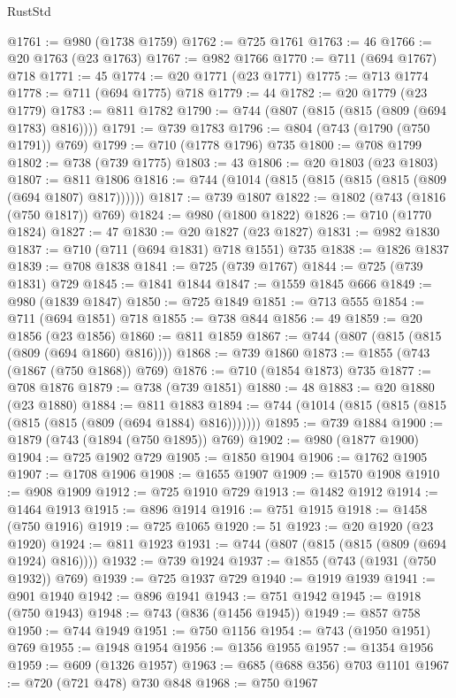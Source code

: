 \begin{lexlean}{RustStd}
\begin{coremodule}
@1761 := @980 (@1738 @1759)
@1762 := @725 @1761
@1763 := 46
@1766 := @20 @1763 (@23 @1763)
@1767 := @982 @1766
@1770 := @711 (@694 @1767) @718
@1771 := 45
@1774 := @20 @1771 (@23 @1771)
@1775 := @713 @1774
@1778 := @711 (@694 @1775) @718
@1779 := 44
@1782 := @20 @1779 (@23 @1779)
@1783 := @811 @1782
@1790 := @744 (@807 (@815 (@815 (@809 (@694 @1783) @816))))
@1791 := @739 @1783
@1796 := @804 (@743 (@1790 (@750 @1791)) @769)
@1799 := @710 (@1778 @1796) @735
@1800 := @708 @1799
@1802 := @738 (@739 @1775)
@1803 := 43
@1806 := @20 @1803 (@23 @1803)
@1807 := @811 @1806
@1816 := @744 (@1014 (@815 (@815 (@815 (@815 (@809 (@694 @1807) @817))))))
@1817 := @739 @1807
@1822 := @1802 (@743 (@1816 (@750 @1817)) @769)
@1824 := @980 (@1800 @1822)
@1826 := @710 (@1770 @1824)
@1827 := 47
@1830 := @20 @1827 (@23 @1827)
@1831 := @982 @1830
@1837 := @710 (@711 (@694 @1831) @718 @1551) @735
@1838 := @1826 @1837
@1839 := @708 @1838
@1841 := @725 (@739 @1767)
@1844 := @725 (@739 @1831) @729
@1845 := @1841 @1844
@1847 := @1559 @1845 @666
@1849 := @980 (@1839 @1847)
@1850 := @725 @1849
@1851 := @713 @555
@1854 := @711 (@694 @1851) @718
@1855 := @738 @844
@1856 := 49
@1859 := @20 @1856 (@23 @1856)
@1860 := @811 @1859
@1867 := @744 (@807 (@815 (@815 (@809 (@694 @1860) @816))))
@1868 := @739 @1860
@1873 := @1855 (@743 (@1867 (@750 @1868)) @769)
@1876 := @710 (@1854 @1873) @735
@1877 := @708 @1876
@1879 := @738 (@739 @1851)
@1880 := 48
@1883 := @20 @1880 (@23 @1880)
@1884 := @811 @1883
@1894 := @744 (@1014 (@815 (@815 (@815 (@815 (@815 (@809 (@694 @1884) @816)))))))
@1895 := @739 @1884
@1900 := @1879 (@743 (@1894 (@750 @1895)) @769)
@1902 := @980 (@1877 @1900)
@1904 := @725 @1902 @729
@1905 := @1850 @1904
@1906 := @1762 @1905
@1907 := @1708 @1906
@1908 := @1655 @1907
@1909 := @1570 @1908
@1910 := @908 @1909
@1912 := @725 @1910 @729
@1913 := @1482 @1912
@1914 := @1464 @1913
@1915 := @896 @1914
@1916 := @751 @1915
@1918 := @1458 (@750 @1916)
@1919 := @725 @1065
@1920 := 51
@1923 := @20 @1920 (@23 @1920)
@1924 := @811 @1923
@1931 := @744 (@807 (@815 (@815 (@809 (@694 @1924) @816))))
@1932 := @739 @1924
@1937 := @1855 (@743 (@1931 (@750 @1932)) @769)
@1939 := @725 @1937 @729
@1940 := @1919 @1939
@1941 := @901 @1940
@1942 := @896 @1941
@1943 := @751 @1942
@1945 := @1918 (@750 @1943)
@1948 := @743 (@836 (@1456 @1945))
@1949 := @857 @758
@1950 := @744 @1949
@1951 := @750 @1156
@1954 := @743 (@1950 @1951) @769
@1955 := @1948 @1954
@1956 := @1356 @1955
@1957 := @1354 @1956
@1959 := @609 (@1326 @1957)
@1963 := @685 (@688 @356) @703 @1101
@1967 := @720 (@721 @478) @730 @848
@1968 := @750 @1967

\end{coremodule}
\end{lexlean}
